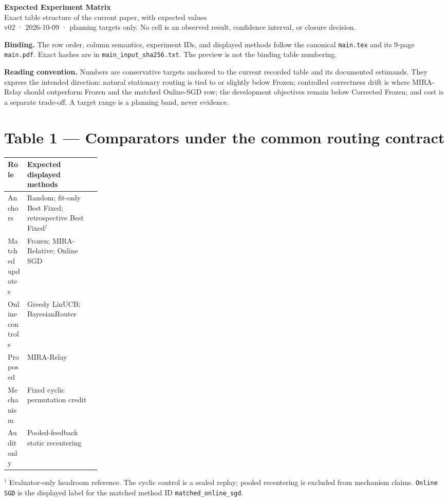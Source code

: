 \documentclass[10pt]{article}
\newcommand{\smallnote}[1]{{\footnotesize\color{Gray}#1}}
\begin{document}
{\color{Blue}\Large\bfseries Expected Experiment Matrix}\\
{\color{Ink}\large Exact table structure of the current paper, with expected values}\\
\smallnote{v02 · 2026-10-09 · planning targets only. No cell is an observed result, confidence interval, or closure decision.}

\small
\textbf{Binding.}
The row order, column semantics, experiment IDs, and displayed methods follow the canonical
\texttt{main.tex} and its 9-page \texttt{main.pdf}. Exact hashes are in
\texttt{main\_input\_sha256.txt}. The preview is not the binding table numbering.

\textbf{Reading convention.}
Numbers are conservative targets anchored to the current recorded table and its documented estimands.
They express the intended direction: natural stationary routing is tied to or slightly below Frozen;
controlled correctness drift is where MIRA-Relay should outperform Frozen and the matched Online-SGD row;
the development objectives remain below Corrected Frozen; and cost is a separate trade-off.
A target range is a planning band, never evidence.

\section*{Table 1 --- Comparators under the common routing contract}
\begin{tabularx}{\linewidth}{@{}p{0.21\linewidth}X@{}}
\toprule
Role & Expected displayed methods \\
\midrule
Anchors & Random; fit-only Best Fixed; retrospective Best Fixed$^{\dagger}$ \\
Matched updates & Frozen; MIRA-Relative; Online SGD \\
Online controls & Greedy LinUCB; BayesianRouter \\
Proposed & MIRA-Relay \\
\midrule
Mechanism & Fixed cyclic permutation credit \\
Audit only & Pooled-feedback static recentering \\
\bottomrule
\end{tabularx}
\smallnote{$^{\dagger}$ Evaluator-only headroom reference. The cyclic control is a sealed replay; pooled recentering is excluded from mechanism claims. \texttt{Online SGD} is the displayed label for the matched method ID \texttt{matched\_online\_sgd}.}
\end{document}

